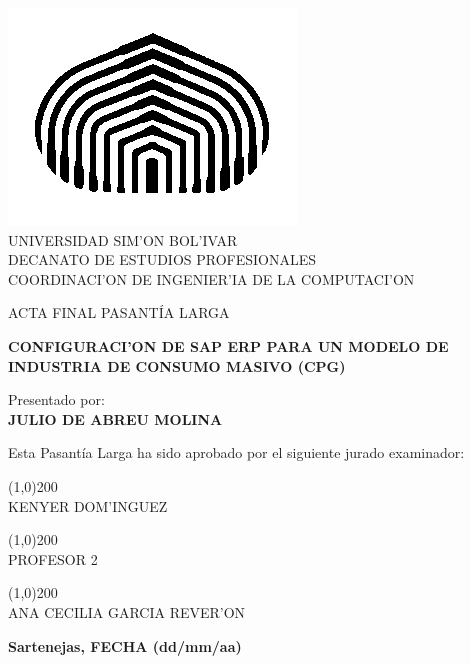 \begin{titlepage}
\begin{center}

\includegraphics[scale=0.5,type=png,ext=.png,read=.png]{figures/cebolla} \\

\textsc {\large UNIVERSIDAD SIM'ON BOL'IVAR} \\
\textsc{DECANATO DE ESTUDIOS PROFESIONALES\\
COORDINACI'ON DE INGENIER'IA DE LA COMPUTACI'ON}

\bigskip
\bigskip
\bigskip
\bigskip
\bigskip
\bigskip

\textsc{ACTA FINAL PASANT\'IA LARGA}

\bigskip
\bigskip

\textsc{\bfseries CONFIGURACI'ON DE SAP ERP PARA UN MODELO DE INDUSTRIA DE CONSUMO MASIVO (CPG)}

\bigskip
\bigskip
\bigskip
\bigskip

\begin{minipage}{\textwidth}
\centering
Presentado por: \\
\textsc{\bfseries JULIO DE ABREU MOLINA} \\

\bigskip
\bigskip
\bigskip
\bigskip

Esta Pasant\'ia Larga ha sido aprobado por el siguiente jurado examinador: \\

\bigskip
\bigskip

\line(1,0){200} \\
KENYER DOM'INGUEZ\\

\bigskip
\bigskip

\line(1,0){200} \\
PROFESOR 2 \\

\bigskip
\bigskip

\line(1,0){200} \\
ANA CECILIA GARCIA REVER'ON \\
\end{minipage}

\bigskip
\bigskip
\vfill

{\large \bfseries Sartenejas, FECHA (dd/mm/aa)}

\end{center}
\end{titlepage}
